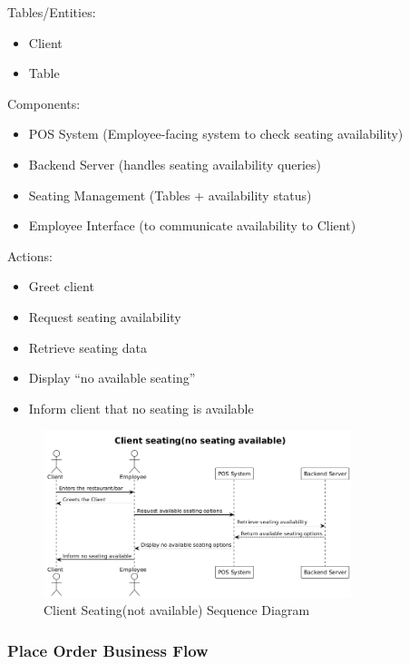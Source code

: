 \documentclass[]{VUMIFTemplateClass}
\begin{document}
Tables/Entities:
\begin{itemize}
\setlength{\itemsep}{2pt}
\setlength{\parskip}{0pt}
\setlength{\parsep}{0pt}
\item Client
\item Table
\end{itemize}

Components:
\begin{itemize}
\setlength{\itemsep}{2pt}
\setlength{\parskip}{0pt}
\setlength{\parsep}{0pt}
\item POS System (Employee-facing system to check seating availability)
\item Backend Server (handles seating availability queries)
\item Seating Management (Tables + availability status)
\item Employee Interface (to communicate availability to Client)
\end{itemize}

Actions:
\begin{itemize}
\setlength{\itemsep}{2pt}
\setlength{\parskip}{0pt}
\setlength{\parsep}{0pt}
\item Greet client
\item Request seating availability
\item Retrieve seating data
\item Display “no available seating”
\item Inform client that no seating is available
\end{itemize}

\begin{figure}[H]
    \centering
    \includegraphics[width=0.8\textwidth]{images/diagrams/services/order_client_seating_not_available_sequence.png}
    \caption{Client Seating(not available) Sequence Diagram}
    \label{fig:client_seating_not_available_sequence}
\end{figure}

\subsubsection{Place Order Business Flow}
\end{document}
